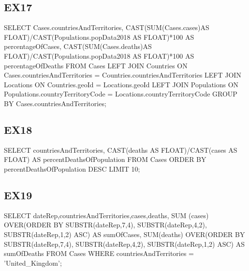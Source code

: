 \documentclass{article}
\begin{document}
\subsection{EX17}
SELECT Cases.countriesAndTerritories,\newline
       CAST(SUM(Cases.cases)AS FLOAT)/CAST(Populations.popData2018 AS FLOAT)*100\newline
       AS percentageOfCases,\newline
       CAST(SUM(Cases.deaths)AS FLOAT)/CAST(Populations.popData2018 AS FLOAT)*100\newline
       AS percentageOfDeaths\newline
FROM Cases\newline
LEFT JOIN Countries\newline
    ON Cases.countriesAndTerritories = Countries.countriesAndTerritories\newline
LEFT JOIN Locations\newline
    ON Countries.geoId = Locations.geoId\newline
LEFT JOIN Populations\newline
    ON Populations.countryTerritoryCode = Locations.countryTerritoryCode\newline
GROUP BY Cases.countriesAndTerritories;\newline
\subsection{EX18}
SELECT countriesAndTerritories,\newline
       CAST(deaths AS FLOAT)/CAST(cases AS FLOAT) AS percentDeathsOfPopulation\newline
FROM Cases\newline
ORDER BY percentDeathsOfPopulation DESC\newline
LIMIT 10;\newline
\subsection{EX19}
SELECT dateRep,countriesAndTerritories,cases,deaths,\newline
       SUM (cases) OVER(ORDER BY SUBSTR(dateRep,7,4),\newline
            SUBSTR(dateRep,4,2),\newline
            SUBSTR(dateRep,1,2) ASC) AS sumOfCases,\newline
       SUM(deaths) OVER(ORDER BY SUBSTR(dateRep,7,4),\newline
            SUBSTR(dateRep,4,2),\newline
            SUBSTR(dateRep,1,2) ASC) AS sumOfDeaths\newline
FROM Cases\newline
WHERE countriesAndTerritories = 'United\_Kingdom';\newline
\end{document}
